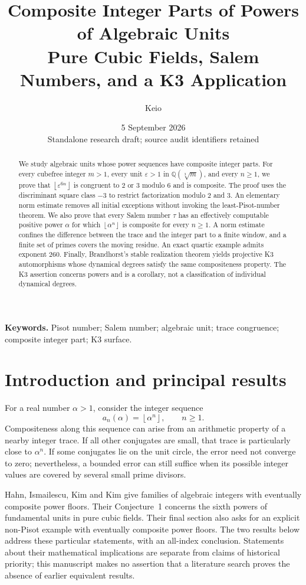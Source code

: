 \documentclass[11pt,a4paper]{article}
\author{Keio}
\date{5 September 2026\\\small Standalone research draft; source audit identifiers retained}
\title{Composite Integer Parts of Powers of Algebraic Units\\\large Pure Cubic Fields, Salem Numbers, and a K3 Application}
\theoremstyle{definition}\newtheorem{definition}[theorem]{Definition}
\theoremstyle{remark}\newtheorem{remark}[theorem]{Remark}
\newcommand{\Q}{\mathbb Q}\newcommand{\Z}{\mathbb Z}\newcommand{\N}{\mathbb N}\newcommand{\R}{\mathbb R}\newcommand{\C}{\mathbb C}
\newcommand{\floor}[1]{\left\lfloor #1\right\rfloor}\newcommand{\ceil}[1]{\left\lceil #1\right\rceil}
\begin{document}
\maketitle
\begin{abstract}
We study algebraic units whose power sequences have composite integer parts. For every cubefree integer $m>1$, every unit $\varepsilon>1$ in $\Q(\sqrt[3]{m})$, and every $n\ge1$, we prove that $\floor{\varepsilon^{6n}}$ is congruent to $2$ or $3$ modulo $6$ and is composite. The proof uses the discriminant square class $-3$ to restrict factorization modulo $2$ and $3$. An elementary norm estimate removes all initial exceptions without invoking the least-Pisot-number theorem. We also prove that every Salem number $\tau$ has an effectively computable positive power $\alpha$ for which $\floor{\alpha^n}$ is composite for every $n\ge1$. A norm estimate confines the difference between the trace and the integer part to a finite window, and a finite set of primes covers the moving residue. An exact quartic example admits exponent $260$. Finally, Brandhorst's stable realization theorem yields projective K3 automorphisms whose dynamical degrees satisfy the same compositeness property. The K3 assertion concerns powers and is a corollary, not a classification of individual dynamical degrees.
\end{abstract}
\noindent\textbf{Keywords.} Pisot number; Salem number; algebraic unit; trace congruence; composite integer part; K3 surface.

\section{Introduction and principal results}
For a real number $\alpha>1$, consider the integer sequence
\[
 a_n(\alpha)=\floor{\alpha^n},\qquad n\ge1.
\]
Compositeness along this sequence can arise from an arithmetic property of a nearby integer trace. If all other conjugates are small, that trace is particularly close to $\alpha^n$. If some conjugates lie on the unit circle, the error need not converge to zero; nevertheless, a bounded error can still suffice when its possible integer values are covered by several small prime divisors.

Hahn, Ismailescu, Kim and Kim \cite{HIKK} give families of algebraic integers with eventually composite power floors. Their Conjecture~1 concerns the sixth powers of fundamental units in pure cubic fields. Their final section also asks for an explicit non-Pisot example with eventually composite power floors. The two results below address these particular statements, with an all-index conclusion. Statements about their mathematical implications are separate from claims of historical priority; this manuscript makes no assertion that a literature search proves the absence of earlier equivalent results.
\end{document}
